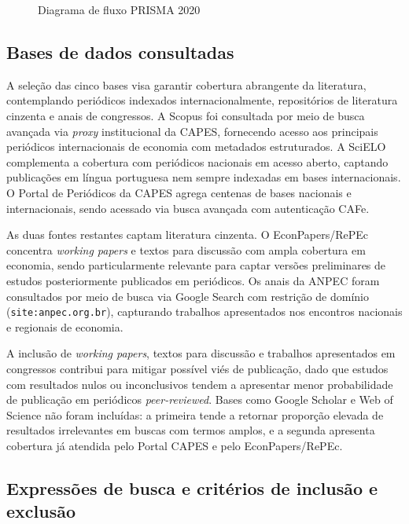 \begin{figure}[htb]
\centering
\caption{Diagrama de fluxo PRISMA 2020}
\label{fig:diagrama_prisma}

\end{figure}

\subsection{Bases de dados consultadas}
\label{subsec:metodo-bases-dados}

A seleção das cinco bases visa garantir cobertura abrangente da literatura, contemplando periódicos indexados internacionalmente, repositórios de literatura cinzenta e anais de congressos. A Scopus foi consultada por meio de busca avançada via \textit{proxy} institucional da CAPES, fornecendo acesso aos principais periódicos internacionais de economia com metadados estruturados. A SciELO complementa a cobertura com periódicos nacionais em acesso aberto, captando publicações em língua portuguesa nem sempre indexadas em bases internacionais. O Portal de Periódicos da CAPES agrega centenas de bases nacionais e internacionais, sendo acessado via busca avançada com autenticação CAFe.

As duas fontes restantes captam literatura cinzenta. O EconPapers/RePEc concentra \textit{working papers} e textos para discussão com ampla cobertura em economia, sendo particularmente relevante para captar versões preliminares de estudos posteriormente publicados em periódicos. Os anais da ANPEC foram consultados por meio de busca via Google Search com restrição de domínio (\texttt{site:anpec.org.br}), capturando trabalhos apresentados nos encontros nacionais e regionais de economia.

A inclusão de \textit{working papers}, textos para discussão e trabalhos apresentados em congressos contribui para mitigar possível viés de publicação, dado que estudos com resultados nulos ou inconclusivos tendem a apresentar menor probabilidade de publicação em periódicos \textit{peer-reviewed}. Bases como Google Scholar e Web of Science não foram incluídas: a primeira tende a retornar proporção elevada de resultados irrelevantes em buscas com termos amplos, e a segunda apresenta cobertura já atendida pelo Portal CAPES e pelo EconPapers/RePEc.

\subsection{Expressões de busca e critérios de inclusão e exclusão}
\label{subsec:metodo-criterios}

